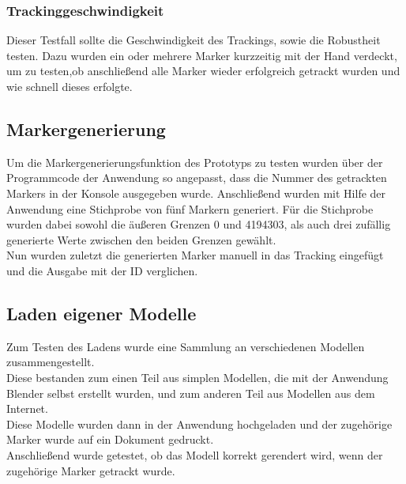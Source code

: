 \subsubsection{Trackinggeschwindigkeit} Dieser Testfall sollte die Geschwindigkeit des Trackings, sowie die Robustheit testen. Dazu wurden ein oder mehrere Marker kurzzeitig mit der Hand verdeckt, um zu testen,ob anschließend alle Marker wieder erfolgreich getrackt wurden und wie schnell dieses erfolgte.


\subsection{Markergenerierung}
Um die Markergenerierungsfunktion des Prototyps zu testen wurden über der Programmcode der Anwendung so angepasst, dass die Nummer des getrackten Markers in der Konsole ausgegeben wurde. Anschließend wurden mit Hilfe der Anwendung eine Stichprobe von fünf Markern generiert. Für die Stichprobe wurden dabei sowohl die äußeren Grenzen 0 und 4194303, als auch drei zufällig generierte Werte zwischen den beiden Grenzen gewählt.\\
Nun wurden zuletzt die generierten Marker manuell in das Tracking eingefügt und die Ausgabe mit der ID verglichen.

\subsection{Laden eigener Modelle}
Zum Testen des Ladens wurde eine Sammlung an verschiedenen Modellen zusammengestellt.\\
Diese bestanden zum einen Teil aus simplen Modellen, die mit der Anwendung Blender selbst erstellt wurden, und zum anderen Teil aus Modellen aus dem Internet.\\
Diese Modelle wurden dann in der Anwendung hochgeladen und der zugehörige Marker wurde auf ein Dokument gedruckt. \\
Anschließend wurde getestet, ob das Modell korrekt gerendert wird, wenn der zugehörige Marker getrackt wurde.






